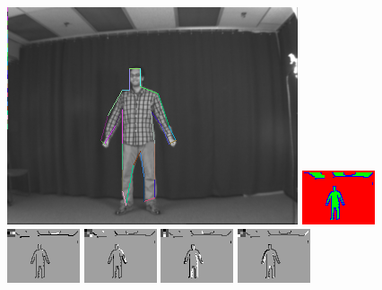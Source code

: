 \begin{figure}
\includegraphics[width=0.48 \linewidth]{output/2.detection/local_inference/out.s1.0010.d/thefinalparse.png}
\includegraphics[width=0.48 \linewidth]{output/2.detection/local_inference/out.s1.0010.d/local.x5.interior.png}
\includegraphics[width=0.24 \linewidth]{output/2.detection/local_inference/out.s1.0010.d/local.x5.orientations.0.png}
\includegraphics[width=0.24 \linewidth]{output/2.detection/local_inference/out.s1.0010.d/local.x5.orientations.1.png}
\includegraphics[width=0.24 \linewidth]{output/2.detection/local_inference/out.s1.0010.d/local.x5.orientations.2.png}
\includegraphics[width=0.24 \linewidth]{output/2.detection/local_inference/out.s1.0010.d/local.x5.orientations.3.png}


\end{figure}
